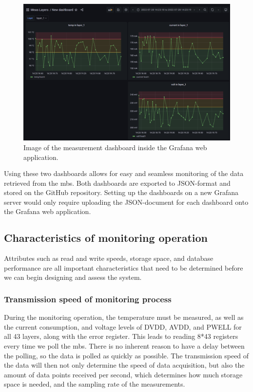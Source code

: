 \documentclass[main.tex]{subfiles}
\begin{document}
\begin{figure}[!ht]
    \centering
    \includegraphics[width=15cm, scale=4]{images/grafana_2nd_dashboard.png}
    \caption{Image of the measurement dashboard inside the Grafana web application.}
    \label{fig: grafana second}
\end{figure}
\FloatBarrier

Using these two dashboards allows for easy and seamless monitoring of the data retrieved from the \gls{mb}s. Both dashboards are exported to JSON-format and stored on the GitHub repository. Setting up the dashboards on a new Grafana server would only require uploading the JSON-document for each dashboard onto the Grafana web application.



\subsection{Characteristics of monitoring operation}
\label{ssec: char_mon}
Attributes such as read and write speeds, storage space, and database performance are all important characteristics that need to be determined before we can begin designing and assess the system.


\subsubsection{Transmission speed of monitoring process}
During the monitoring operation, the temperature must be measured, as well as the current consumption, and voltage levels of DVDD, AVDD, and PWELL for all 43 layers, along with the error register. This leads to reading 8*43 registers every time we poll the \gls{mb}s. There is no inherent reason to have a delay between the polling, so the data is polled as quickly as possible. The transmission speed of the data will then not only determine the speed of data acquisition, but also the amount of data points received per second, which determines how much storage space is needed, and the sampling rate of the measurements.
\end{document}
